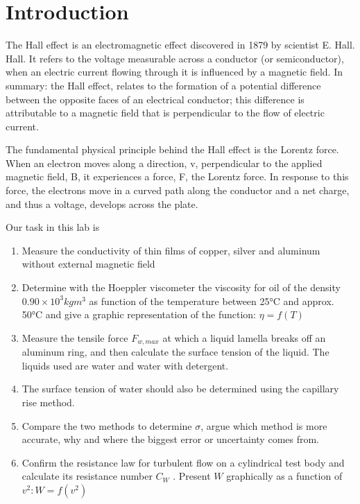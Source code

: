\documentclass{article}
\begin{document}
\newpage

\section{Introduction}
The Hall effect is an electromagnetic effect discovered in 1879 by scientist E. Hall. Hall. It refers to the voltage measurable across a conductor (or semiconductor), when an electric current flowing through it is influenced by a magnetic field.
In summary: the Hall effect, relates to the formation of a potential difference between the opposite faces of an electrical conductor; this difference is attributable to a magnetic field that is perpendicular to the flow of electric current. \par
The fundamental physical principle behind the Hall effect is the Lorentz force. When an electron moves along a direction, v, perpendicular to the applied magnetic field, B, it experiences a force, F, the Lorentz force.
In response to this force, the electrons move in a curved path along the conductor and a net charge, and thus a voltage, develops across the plate.\par
Our task in this lab is

\begin{enumerate} %
	\item Measure the conductivity of thin films of copper, silver and aluminum without external magnetic field
	\item Determine with the Hoeppler viscometer the viscosity for oil of the density $0.90\times10^{3} kgm^{3}$ as function of the temperature between 25°C and approx. 50°C and give a graphic representation of the function: $\eta = f(T)$
	\item Measure the tensile force $F_{w,max}$ at which a liquid lamella breaks off an aluminum ring, and then calculate the surface tension of the liquid. The liquids used are water and water with detergent.
	\item The surface tension of water should also be determined using the capillary rise method. 
	\item Compare the two methods to determine $\sigma $, argue which method is more accurate, why and where the biggest error or uncertainty comes from.
	\item Confirm the resistance law for turbulent flow on a cylindrical test body and calculate its resistance number $C_{W}$ . Present $W$ graphically as a function of $v^{2}: W = f(v^{2})$
\end{enumerate}
\end{document}
